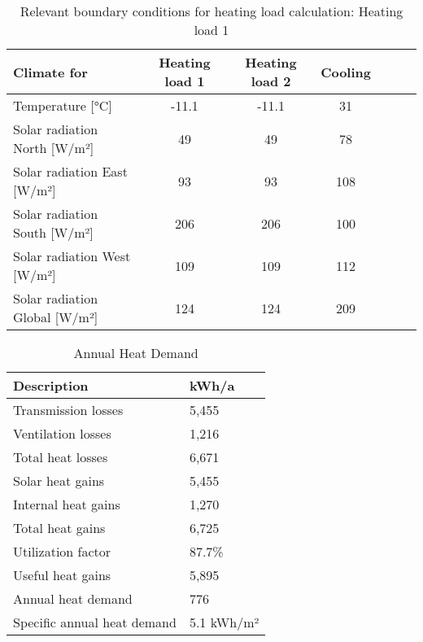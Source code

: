 \documentclass{article}
\begin{document}
\begin{table}[h!]
    \centering
    \begin{tabular}{@{}lcccccc@{}}
        \toprule
        Climate for & Heating load 1 & Heating load 2 & Cooling \\ \midrule
        Temperature [°C] & -11.1 & -11.1 & 31 \\
        Solar radiation North [W/m²] & 49 & 49 & 78 \\
        Solar radiation East [W/m²] & 93 & 93 & 108 \\
        Solar radiation South [W/m²] & 206 & 206 & 100 \\
        Solar radiation West [W/m²] & 109 & 109 & 112 \\
        Solar radiation Global [W/m²] & 124 & 124 & 209 \\ \bottomrule
    \end{tabular}
    \caption{Relevant boundary conditions for heating load calculation: Heating load 1}
\end{table}


\begin{table}[h!]
    \centering
    \caption{Annual Heat Demand}
    \begin{tabular}{@{}ll@{}}
        \toprule
        \textbf{Description}         & \textbf{kWh/a} \\ \midrule
        Transmission losses          & 5,455          \\
        Ventilation losses           & 1,216          \\
        Total heat losses            & 6,671          \\
        Solar heat gains             & 5,455          \\
        Internal heat gains          & 1,270          \\
        Total heat gains             & 6,725          \\
        Utilization factor           & 87.7\%         \\
        Useful heat gains            & 5,895          \\ \midrule
        Annual heat demand           & 776            \\
        Specific annual heat demand   & 5.1 kWh/m²     \\ \bottomrule
    \end{tabular}
\end{table}
\end{document}
